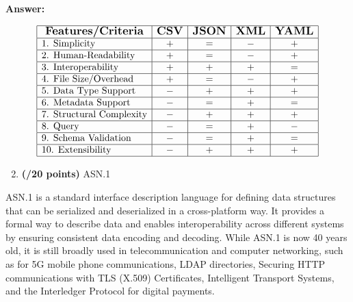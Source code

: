 \documentclass[a4paper,10pt]{article}
\begin{document}
\textbf{Answer:}

\[
\begin{array}{|c|c|c|c|c|}
    \hline
    \textbf{\large Features/Criteria} & \textbf{\large CSV} & \textbf{\large JSON} & \textbf{\large XML} & \textbf{\large YAML} \\
    \hline
    \multicolumn{1}{|l|}{\text{1. Simplicity}} & + & = & - & + \\
    \hline
    \multicolumn{1}{|l|}{\text{2. Human-Readability}} & + & = & - & + \\
    \hline
    \multicolumn{1}{|l|}{\text{3. Interoperability}} & + & + & + & = \\
    \hline
    \multicolumn{1}{|l|}{\text{4. File Size/Overhead}} & + & = & - & + \\
    \hline
    \multicolumn{1}{|l|}{\text{5. Data Type Support}} & - & + & + & + \\
    \hline
    \multicolumn{1}{|l|}{\text{6. Metadata Support}} & - & = & + & = \\
    \hline
    \multicolumn{1}{|l|}{\text{7. Structural Complexity}} & - & + & + & + \\
    \hline
    \multicolumn{1}{|l|}{\text{8. Query}} & - & = & + & - \\
    \hline
    \multicolumn{1}{|l|}{\text{9. Schema Validation}} & - & = & + & = \\
    \hline
    \multicolumn{1}{|l|}{\text{10. Extensibility}} & - & + & + & + \\
    \hline
\end{array}
\]

\break

\begin{enumerate}[label=\textbf{Part \arabic*.}]
    \setcounter{enumi}{1}
    \item \textbf{(/20 points)} ASN.1
\end{enumerate}

ASN.1 is a standard interface description language for defining data structures that can be serialized and deserialized
in a cross-platform way. It provides a formal way to describe data and enables interoperability across different
systems by ensuring consistent data encoding and decoding. While ASN.1 is now 40 years old, it is still broadly used
in telecommunication and computer networking, such as for 5G mobile phone communications, LDAP directories,
Securing HTTP communications with TLS (X.509) Certificates, Intelligent Transport Systems, and the Interledger
Protocol for digital payments.
\end{document}
